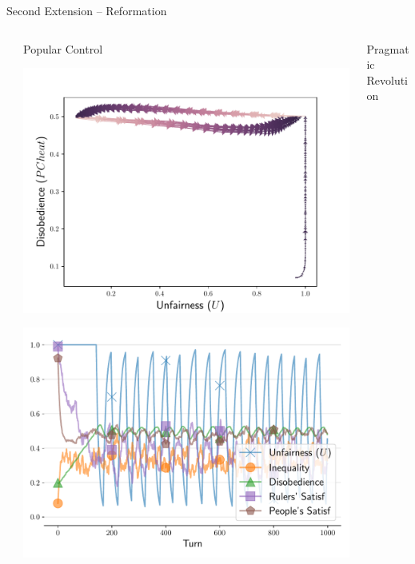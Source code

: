 \documentclass[xcolor={table}]{beamer}
\begin{document}
\begin{frame}[fragile=singleslide,t]
\begin{columns}[T]
\begin{column}{.58\textwidth}
\begin{block}{Second Extension -- Reformation}
\begin{columns}[T]
\begin{column}{.333\textwidth}
\end{column}
\begin{column}{.333\textwidth}



\begin{center}
Popular Control

\includegraphics[width=\linewidth]{img/trajtories.pdf}\label{fig:toriesphase}

\includegraphics[width=.9\linewidth]{img/timetories.pdf}\label{fig:toriestime}
\end{center}


\end{column}

\begin{column}{.333\textwidth}

\begin{center}
Pragmatic Revolution


\end{center}
\end{column}
\end{columns}
\end{block}
\end{column}
\end{columns}
\end{frame}
\end{document}
